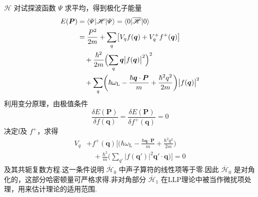 $\mathscr{H}$ 对试探波函数 $\varPsi$ 求平均，得到极化子能量
\begin{equation}
\begin{aligned}
  E(\boldsymbol{P})&=\langle\varPsi|\mathscr{H}|\varPsi\rangle
  =\langle0|\overline{\mathscr{H}}|0\rangle\\
  &=\frac{P^{2}}{2m}+\sum_{q}\bigl[V_{q}f(\boldsymbol{q})
  +V_{q}^{+}f^{+}(\boldsymbol{q})\bigr]\\
  &\quad+\frac{\hbar^{2}}{2m}\Bigl(\sum_{q}\boldsymbol{q}
  \bigl|f(\boldsymbol{q})\bigr|^{2}\Bigr)^{2}\\
  &\quad+\sum_{q}\biggl(\hbar\omega_{\mathrm L}
  -\frac{\hbar\boldsymbol{q}\cdot\boldsymbol{P}}{m}
  +\frac{\hbar^{2}q^{2}}{2m}\biggr)\bigl|f(\boldsymbol{q})\bigr|^{2}
\end{aligned}
\end{equation}
利用变分原理，由极值条件
\begin{equation}
  \frac{\delta E(\boldsymbol{P})}{\delta f(\boldsymbol{q})}
  =\frac{\delta E(\boldsymbol{P})}{\delta f^{+}(\boldsymbol{q})}=0
\end{equation}
决定f及 $f^{+}$，求得
\begin{equation}
\begin{aligned}
  V_{q}&+f^{+}(\boldsymbol{q})\biggl[\biggl(\hbar\omega_{\mathrm L}
  -\frac{\hbar\boldsymbol{q}\cdot\boldsymbol{P}}{m}
  +\frac{\hbar^{2}q^{2}}{2m}\biggr)\\
  &\quad+\frac{\hbar^{2}}{m}\biggl(\sum_{q'}\bigl|f(\boldsymbol{q}')\bigr|^{2}
  \boldsymbol{q}'\cdot\boldsymbol{q}\biggr)\biggr]=0
\end{aligned}
\end{equation}
及其共轭复数方程.这一条件说明 $\overline{\mathscr{H}}_{0}$ 中声子算符的线性项等于零.因此 $\overline{\mathscr{H}}_{0}$ 是对角化的，这部分哈密顿量可严格求得.非对角部分 $\overline{\mathscr{H}}_{1}$ 在LLP理论中被当作微扰项处理，用来估计理论的适用范围.

